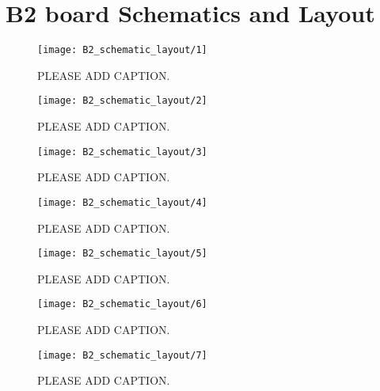 \chapter{B2 board Schematics and Layout}

\begin{figure}
 \centering
 \texttt{[image: B2\_schematic\_layout/1]}
 \caption{PLEASE ADD CAPTION.}
 \label{fig:b2_sch_lo_1}
\end{figure}

\begin{figure}
 \centering
 \texttt{[image: B2\_schematic\_layout/2]}
 \caption{PLEASE ADD CAPTION.}
 \label{fig:b2_sch_lo_2}
\end{figure}

\begin{figure}
 \centering
 \texttt{[image: B2\_schematic\_layout/3]}
 \caption{PLEASE ADD CAPTION.}
 \label{fig:b2_sch_lo_3}
\end{figure}

\begin{figure}
 \centering
 \texttt{[image: B2\_schematic\_layout/4]}
 \caption{PLEASE ADD CAPTION.}
 \label{fig:b2_sch_lo_4}
\end{figure}

\begin{figure}
 \centering
 \texttt{[image: B2\_schematic\_layout/5]}
 \caption{PLEASE ADD CAPTION.}
 \label{fig:b2_sch_lo_5}
\end{figure}

\begin{figure}
 \centering
 \texttt{[image: B2\_schematic\_layout/6]}
 \caption{PLEASE ADD CAPTION.}
 \label{fig:b2_sch_lo_6}
\end{figure}

\begin{figure}
 \centering
 \texttt{[image: B2\_schematic\_layout/7]}
 \caption{PLEASE ADD CAPTION.}
 \label{fig:b2_sch_lo_7}
\end{figure}